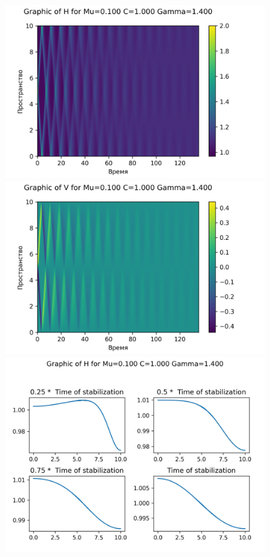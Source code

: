 \begin{figure}[H]
	\centering
	\includegraphics[scale=0.5]{../graphs_data_nonsmooth_2/value/Graph_H_mu0.100_C1.000_gamma1.400.png}
	\includegraphics[scale=0.5]{../graphs_data_nonsmooth_2/value/Graph_V_mu0.100_C1.000_gamma1.400.png}	
	\includegraphics[scale=0.5]{../graphs_data_nonsmooth_2/slices/Graph_H_mu0.100_C1.000_gamma1.400.png}

\end{figure}

